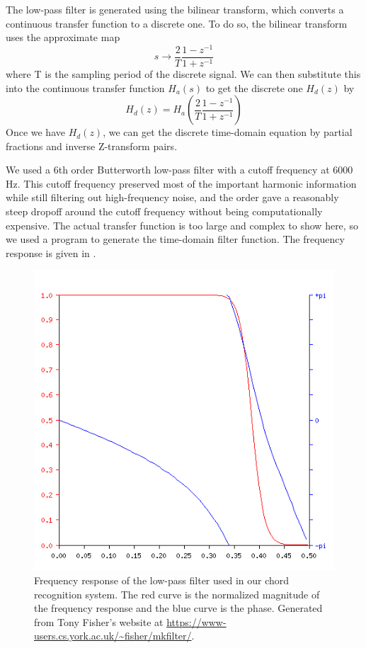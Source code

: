 \documentclass[journal]{IEEEtran}
\begin{document}
The low-pass filter is generated using the bilinear transform, which converts a continuous transfer function to a discrete one.
To do so, the bilinear transform uses the approximate map
\begin{equation}
    s \to \frac{2}{T}\frac{1 - z^{-1}}{1 + z^{-1}}
    \label{eq:s_to_z}
\end{equation}
where T is the sampling period of the discrete signal.
We can then substitute this into the continuous transfer function $H_a(s)$ to get the discrete one $H_d(z)$ by 
\begin{equation}
    H_d(z) = H_a\!\left(\frac{2}{T}\frac{1 - z^{-1}}{1 + z^{-1}}\right)
    \label{eq:bilinear}
\end{equation}
Once we have $H_d(z)$, we can get the discrete time-domain equation by partial fractions and inverse Z-transform pairs.

We used a 6th order Butterworth low-pass filter with a cutoff frequency at 6000 Hz.
This cutoff frequency preserved most of the important harmonic information while still filtering out high-frequency noise, and the order gave a reasonably steep dropoff around the cutoff frequency without being computationally expensive.
The actual transfer function is too large and complex to show here, so we used a program to generate the time-domain filter function.
The frequency response is given in .

\begin{figure}[t]
    \centering
    \includegraphics[width=\linewidth]{../Figures/frequency_response}
    \caption{Frequency response of the low-pass filter used in our chord recognition system.
    The red curve is the normalized magnitude of the frequency response and the blue curve is the phase.
    Generated from Tony Fisher's website at \url{https://www-users.cs.york.ac.uk/~fisher/mkfilter/}.}
    \label{fig:frequency_response}
\end{figure}
\end{document}
